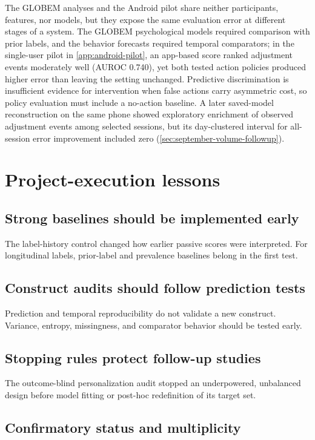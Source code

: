 \documentclass[a4paper,11pt,oneside]{report}
\begin{document}
The GLOBEM analyses and the Android pilot share neither participants, features, nor
models, but they expose the same evaluation error at different stages of a system.
The GLOBEM psychological models required comparison with prior labels, and the
behavior forecasts required temporal comparators; in the single-user pilot in
\cref{app:android-pilot}, an app-based score ranked adjustment events moderately well
(AUROC 0.740), yet both tested action policies produced higher error than leaving the
setting unchanged. Predictive discrimination is insufficient evidence for
intervention when false actions carry asymmetric cost, so policy evaluation must
include a no-action baseline. A later saved-model reconstruction on the same phone
showed exploratory enrichment of observed adjustment events among selected sessions,
but its day-clustered interval for all-session error improvement included zero
(\cref{sec:september-volume-followup}).

\section{Project-execution lessons}

\subsection{Strong baselines should be implemented early}

The label-history control changed how earlier passive scores were interpreted. For
longitudinal labels, prior-label and prevalence baselines belong in the first test.

\subsection{Construct audits should follow prediction tests}

Prediction and temporal reproducibility do not validate a new construct. Variance,
entropy, missingness, and comparator behavior should be tested early.

\subsection{Stopping rules protect follow-up studies}

The outcome-blind personalization audit stopped an underpowered, unbalanced design
before model fitting or post-hoc redefinition of its target set.

\subsection{Confirmatory status and multiplicity}
\end{document}
